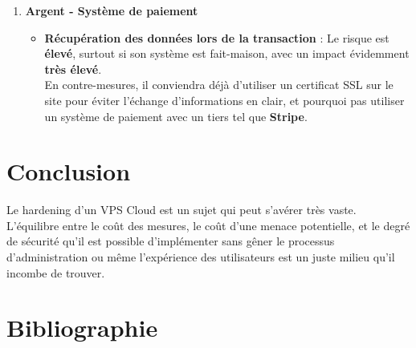 \documentclass[a4paper,10pt,final,fleqn]{article}
\begin{document}
\begin{enumerate}
				\item \textbf{Argent - Système de paiement}

					\begin{itemize}
						\item \textbf{Récupération des données lors de la transaction} : Le risque est \textbf{élevé}, surtout si son système est fait-maison, avec un impact évidemment \textbf{très élevé}.\\
						En contre-mesures, il conviendra déjà d'utiliser un certificat SSL sur le site pour éviter l'échange d'informations en clair, et pourquoi pas utiliser un système de paiement avec un tiers tel que \textbf{Stripe}.\\
					\end{itemize}
					
			\end{enumerate}

	\section{Conclusion}

		Le hardening d'un VPS Cloud est un sujet qui peut s'avérer très vaste.\\

		L'équilibre entre le coût des mesures, le coût d'une menace potentielle, et le degré de sécurité qu'il est possible d'implémenter sans gêner le processus d'administration ou même l'expérience des utilisateurs est un juste milieu qu'il incombe de trouver.\\

	\section{Bibliographie}
\end{document}
